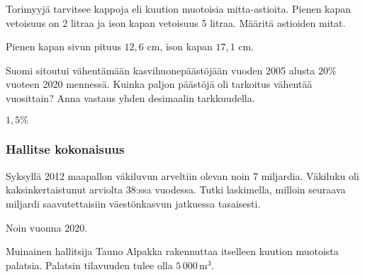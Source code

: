 \begin{tehtavasivu}
\begin{tehtava}%
Torimyyjä tarvitsee kappoja eli kuution muotoisia mitta-astioita. Pienen kapan vetoisuus on 2 litraa ja ison kapan vetoisuus 5 litraa. Määritä astioiden mitat.
\begin{vastaus}
Pienen kapan sivun pituus $12,6$ cm, ison kapan $17,1$ cm. 
\end{vastaus}
\end{tehtava}

\begin{tehtava}%
Suomi sitoutui vähentämään kasvihuonepäästöjään vuoden 2005 alusta $20\%$ vuoteen 2020 mennessä. Kuinka paljon päästöjä oli tarkoitus vähentää vuosittain? Anna vastaus yhden desimaalin tarkkuudella.
\begin{vastaus}
$1,5\%$
\end{vastaus}
\end{tehtava}

\subsubsection*{Hallitse kokonaisuus}
\begin{tehtava}%
Syksyllä 2012 maapallon väkiluvun arveltiin olevan noin 7 miljardia. Väkiluku oli kaksinkertaistunut arviolta 38:ssa vuodessa. Tutki laskimella, milloin seuraava miljardi saavutettaisiin väestönkasvun jatkuessa tasaisesti.
\begin{vastaus}
Noin vuonna 2020.
\end{vastaus}
\end{tehtava}

\begin{tehtava}
Muinainen hallitsija Tauno Alpakka rakennuttaa itselleen kuution muotoista palatsia.  Palatsin tilavuuden tulee olla $5\,000\,\mathrm{m}^3$. 
\begin{alakohdat}
\end{alakohdat}
\begin{vastaus}
\begin{alakohdat}
\end{alakohdat}
\end{vastaus}
\end{tehtava}


\end{tehtavasivu}
